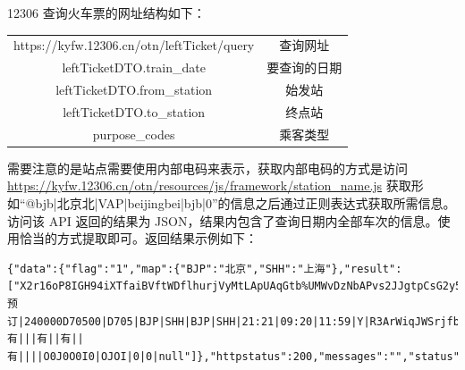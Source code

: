 \documentclass[lang=cn,blue]{elegantbook}
\begin{document}
12306 查询火车票的网址结构如下：
\begin{center}
	\begin{tabular}{cc}
		\hline
		\makebox[0.5\textwidth][c]{参数}	&  \makebox[0.2\textwidth][c]{含义} \\ \hline
		https://kyfw.12306.cn/otn/leftTicket/query & 查询网址 \\
		leftTicketDTO.train\_date & 要查询的日期 \\
		leftTicketDTO.from\_station & 始发站 \\
		leftTicketDTO.to\_station & 终点站 \\
		purpose\_codes & 乘客类型 \\ \hline
	\end{tabular}
\end{center}
需要注意的是站点需要使用内部电码来表示，获取内部电码的方式是访问 \href{https://kyfw.12306.cn/otn/resources/js/framework/station\_name.js}{https://kyfw.12306.cn/otn/resources/js/framework/station\_name.js} 获取形如``@bjb|北京北|VAP|beijingbei|bjb|0''的信息之后通过正则表达式获取所需信息。
访问该 API 返回的结果为 JSON，结果内包含了查询日期内全部车次的信息。使用恰当的方式提取即可。返回结果示例如下：
\begin{lstlisting}[language={}]
{"data":{"flag":"1","map":{"BJP":"北京","SHH":"上海"},"result":["X2r16oP8IGH94iXTfaiBVftWDflhurjVyMtLApUAqGtb%UMWvDzNbAPvs2JJgtpCsG2y5VUJ2l5mC%0AbxIfI7x4izoLOx2%2FQrCgmSw0FTE0HJRw34xqltxHR6QvsJs8ZzcVyUtiZ6O57m%2Btt%2BS7QUfVl23M%0AYkqXZBJdFwX3qw33jZUkU0PLe%2FYfzcinUaZk6VpcbaHLuYoflN4kdE6Vk%2BPrYGpwqehRkGoTElzS%0A8naAdzOg1VyR8vffGyFCZ%2B4F9ZbIMrm0Hm1cVV%2BA2RsOgIps8IwLambwpZ76GgZZRZj0O6%2B0TkGY%0AG8DGrhYOPKg%3D|预订|240000D70500|D705|BJP|SHH|BJP|SHH|21:21|09:20|11:59|Y|R3ArWiqJWSrjfblWAofOiX3%2Bo5Q7Ud8vVMTg1pnCJxohcTRTmikvHJ7nmlo%3D|20190530|3|P4|01|04|0|0||||有|||有||有||有||||O0J0O0I0|OJOI|0|0|null"]},"httpstatus":200,"messages":"","status":true}
\end{lstlisting}
\end{document}
